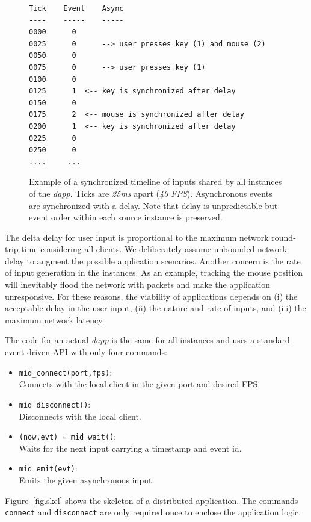 \documentclass[sigplan,screen]{acmart}
\newcommand{\dapp}{\emph{dapp}\xspace}
\begin{document}
\begin{figure}[t]
{\scriptsize
\begin{verbatim}
Tick    Event    Async
----    -----    -----
0000      0
0025      0      --> user presses key (1) and mouse (2)
0050      0
0075      0      --> user presses key (1)
0100      0
0125      1  <-- key is synchronized after delay
0150      0
0175      2  <-- mouse is synchronized after delay
0200      1  <-- key is synchronized after delay
0225      0
0250      0
....     ...
\end{verbatim}
}
  \caption{
    \label{fig.timeline}
    Example of a synchronized timeline of inputs shared by all instances of the
    \dapp.
    Ticks are \emph{25ms} apart (\emph{40 FPS}).
    Asynchronous events are synchronized with a delay.
    Note that delay is unpredictable but event order within each source
    instance is preserved.
  }
\end{figure}

The delta delay for user input is proportional to the maximum network
round-trip time considering all clients.
We deliberately assume unbounded network delay to augment the possible
application scenarios.
Another concern is the rate of input generation in the instances.
As an example, tracking the mouse position will inevitably flood the network
with packets and make the application unresponsive.
For these reasons, the viability of applications depends on
    (i) the acceptable delay in the user input,
    (ii) the nature and rate of inputs, and
    (iii) the maximum network latency.

The code for an actual \dapp is the same for all instances and uses a standard
event-driven API with only four commands:
%
\begin{itemize}
\item \texttt{mid\_connect(port,fps)}:   \\Connects with the local client in the given port and desired FPS.
\item \texttt{mid\_disconnect()}:        \\Disconnects with the local client.
\item \texttt{(now,evt) = mid\_wait()}:  \\Waits for the next input carrying a timestamp and event id.
\item \texttt{mid\_emit(evt)}:           \\Emits the given asynchronous input.
\end{itemize}
%
Figure~\ref{fig.skel} shows the skeleton of a distributed application.
The commands \texttt{connect} and \texttt{disconnect} are only required once to
enclose the application logic.
\end{document}
